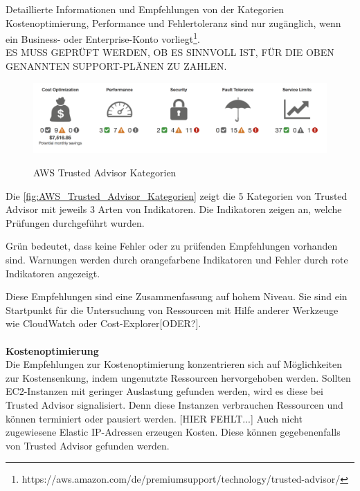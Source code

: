 Detaillierte Informationen und Empfehlungen von der Kategorien Kostenoptimierung, Performance und Fehlertoleranz sind nur zugänglich, wenn ein Business- oder Enterprise-Konto vorliegt\footnote{https://aws.amazon.com/de/premiumsupport/technology/trusted-advisor/}. \\
ES MUSS GEPRÜFT WERDEN, OB ES SINNVOLL IST, FÜR DIE OBEN GENANNTEN SUPPORT-PLÄNEN ZU ZAHLEN.

  \begin{figure}
      \centering
      \includegraphics[scale=0.4]{sources/AWS_Trusted_Advisor_Kategorien}
      \caption[AWS Trusted Advisor Kategorien]{}
      \label{fig:AWS_Trusted_Advisor_Kategorien} AWS Trusted Advisor Kategorien
    \end{figure}

  Die \autoref{fig:AWS_Trusted_Advisor_Kategorien} zeigt die 5 Kategorien von Trusted Advisor mit jeweils 3 Arten von Indikatoren. 
  Die Indikatoren zeigen an, welche Prüfungen durchgeführt wurden.
  
  Grün bedeutet, dass keine Fehler oder zu prüfenden Empfehlungen vorhanden sind. Warnungen werden durch orangefarbene Indikatoren und Fehler durch rote Indikatoren angezeigt.
  
  Diese Empfehlungen sind eine Zusammenfassung auf hohem Niveau. Sie sind ein Startpunkt für die Untersuchung von Ressourcen mit Hilfe anderer Werkzeuge wie CloudWatch oder Cost-Explorer[ODER?].
\\\\

\textbf{Kostenoptimierung}\\
Die Empfehlungen zur Kostenoptimierung konzentrieren sich auf Möglichkeiten zur Kostensenkung, indem ungenutzte Ressourcen hervorgehoben werden. 
Sollten EC2-Instanzen mit geringer Auslastung gefunden werden, wird es diese bei Trusted Advisor signalisiert. Denn diese Instanzen verbrauchen Ressourcen und können terminiert oder pausiert werden. 
[HIER FEHLT...]
Auch nicht zugewiesene Elastic IP-Adressen erzeugen Kosten. Diese können gegebenenfalls von Trusted Advisor gefunden werden. %
\\

